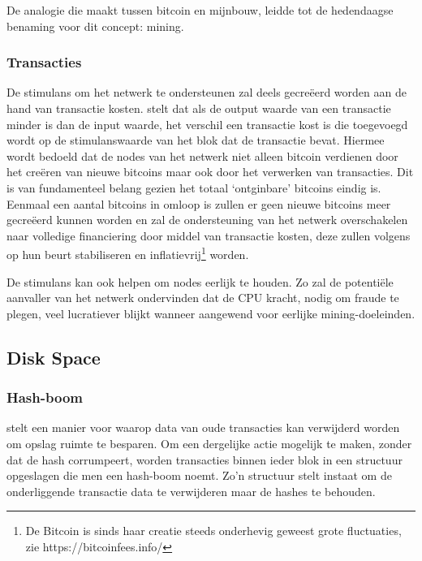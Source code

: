 		De analogie die \textcite{Nakamoto2008} maakt tussen bitcoin en mijnbouw, leidde tot de hedendaagse benaming voor dit concept: mining. 
		
		\subsubsection{Transacties}
		De stimulans om het netwerk te ondersteunen zal deels gecreëerd worden aan de hand van transactie kosten. \textcite{Nakamoto2008} stelt dat als de output waarde van een transactie minder is dan de input waarde, het verschil een transactie kost is die toegevoegd wordt op de stimulanswaarde van het blok dat de transactie bevat. Hiermee wordt bedoeld dat de nodes van het netwerk niet alleen bitcoin verdienen door het creëren van nieuwe bitcoins maar ook door het verwerken van transacties. Dit is van fundamenteel belang gezien het totaal ‘ontginbare’ bitcoins eindig is. Eenmaal een aantal bitcoins in omloop is zullen er geen nieuwe bitcoins meer gecreëerd kunnen worden en zal de ondersteuning van het netwerk overschakelen naar volledige financiering door middel van transactie kosten, deze zullen volgens \textcite{Nakamoto2008} op hun beurt stabiliseren en inflatievrij\footnote{De Bitcoin is sinds haar creatie steeds onderhevig geweest grote fluctuaties, zie https://bitcoinfees.info/} worden.
		
		De stimulans kan ook helpen om nodes eerlijk te houden. Zo zal de potentiële aanvaller van het netwerk ondervinden dat de CPU kracht, nodig om fraude te plegen, veel lucratiever blijkt wanneer aangewend voor eerlijke mining-doeleinden. 
		
		
		
	\subsection{Disk Space}
		\subsubsection{Hash-boom}
		\textcite{Nakamoto2008} stelt  een manier voor waarop data van oude transacties kan verwijderd worden om opslag ruimte te besparen. Om een dergelijke actie mogelijk te maken, zonder dat de hash corrumpeert, worden transacties binnen ieder blok in een structuur opgeslagen die men een hash-boom noemt. Zo’n structuur stelt instaat om de onderliggende transactie data te verwijderen maar de hashes te behouden.
		

